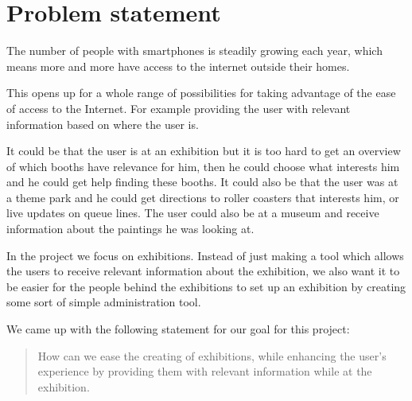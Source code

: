 \section{Problem statement}

The number of people with smartphones is steadily growing each year, which means more and more have access to the internet outside their homes.

This opens up for a whole range of possibilities for taking advantage of the ease of access to the Internet. For example providing the user with relevant information based on where the user is. 

It could be that the user is at an exhibition but it is too hard to get an overview of which booths have relevance for him, then he could choose what interests him and he could get help finding these booths. It could also be that the user was at a theme park and he could get directions to roller coasters that interests him, or live updates on queue lines. The user could also be at a museum and receive information about the paintings he was looking at.  

In the project we focus on exhibitions. Instead of just making a tool which allows the users to receive relevant information about the exhibition, we also want it to be easier for the people behind the exhibitions to set up an exhibition by creating some sort of simple administration tool.

We came up with the following statement for our goal for this project:

\begin{quote}
How can we ease the creating of exhibitions, while enhancing the user's experience by providing them with relevant information while at the exhibition.
\end{quote}

